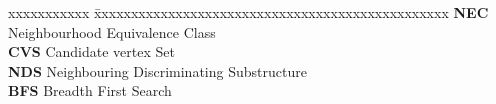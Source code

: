 \abbreviations
\noindent 
\begin{tabbing}
xxxxxxxxxxx \= xxxxxxxxxxxxxxxxxxxxxxxxxxxxxxxxxxxxxxxxxxxxxxxx \kill
\textbf{NEC} \> Neighbourhood Equivalence Class \\
\textbf{CVS}   \> Candidate vertex Set \\
\textbf{NDS}   \> Neighbouring Discriminating Substructure \\
\textbf{BFS}   \> Breadth First Search \\

\end{tabbing}
